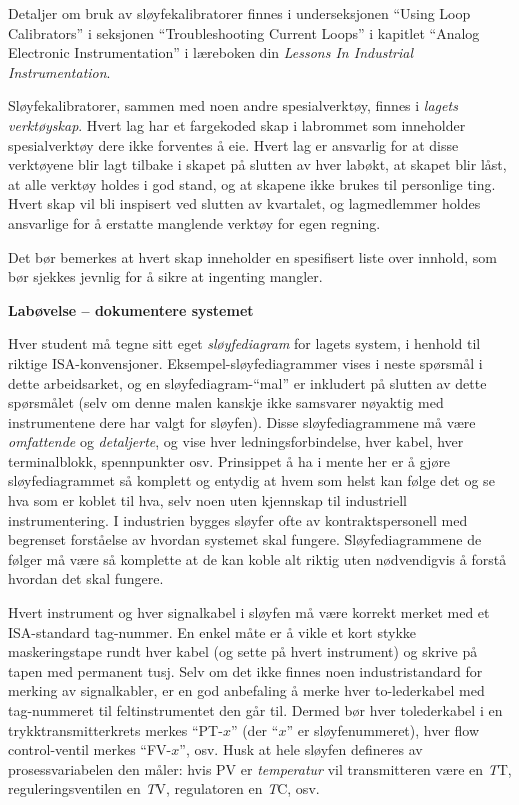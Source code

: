 Detaljer om bruk av sløyfekalibratorer finnes i underseksjonen ``Using Loop Calibrators'' i seksjonen ``Troubleshooting Current Loops'' i kapitlet ``Analog Electronic Instrumentation'' i læreboken din {\it Lessons In Industrial Instrumentation}.

\vskip 10pt

Sløyfekalibratorer, sammen med noen andre spesialverktøy, finnes i {\it lagets verktøyskap}.  Hvert lag har et fargekoded skap i labrommet som inneholder spesialverktøy dere ikke forventes å eie.  Hvert lag er ansvarlig for at disse verktøyene blir lagt tilbake i skapet på slutten av hver labøkt, at skapet blir låst, at alle verktøy holdes i god stand, og at skapene ikke brukes til personlige ting.  Hvert skap vil bli inspisert ved slutten av kvartalet, og lagmedlemmer holdes ansvarlige for å erstatte manglende verktøy for egen regning.

Det bør bemerkes at hvert skap inneholder en spesifisert liste over innhold, som bør sjekkes jevnlig for å sikre at ingenting mangler.








\vfil \eject

\noindent
{\bf Labøvelse -- dokumentere systemet}

\vskip 5pt

Hver student må tegne sitt eget {\it sløyfediagram} for lagets system, i henhold til riktige ISA-konvensjoner.  Eksempel-sløyfediagrammer vises i neste spørsmål i dette arbeidsarket, og en sløyfediagram-``mal'' er inkludert på slutten av dette spørsmålet (selv om denne malen kanskje ikke samsvarer nøyaktig med instrumentene dere har valgt for sløyfen).  Disse sløyfediagrammene må være {\it omfattende} og {\it detaljerte}, og vise hver ledningsforbindelse, hver kabel, hver terminalblokk, spennpunkter osv.  Prinsippet å ha i mente her er å gjøre sløyfediagrammet så komplett og entydig at hvem som helst kan følge det og se hva som er koblet til hva, selv noen uten kjennskap til industriell instrumentering.  I industrien bygges sløyfer ofte av kontraktspersonell med begrenset forståelse av hvordan systemet skal fungere.  Sløyfediagrammene de følger må være så komplette at de kan koble alt riktig uten nødvendigvis å forstå hvordan det skal fungere.

Hvert instrument og hver signalkabel i sløyfen må være korrekt merket med et ISA-standard tag-nummer.  En enkel måte er å vikle et kort stykke maskeringstape rundt hver kabel (og sette på hvert instrument) og skrive på tapen med permanent tusj.  Selv om det ikke finnes noen industristandard for merking av signalkabler, er en god anbefaling å merke hver to-lederkabel med tag-nummeret til feltinstrumentet den går til.  Dermed bør hver tolederkabel i en trykktransmitterkrets merkes ``PT-$x$'' (der ``$x$'' er sløyfenummeret), hver flow control-ventil merkes ``FV-$x$'', osv.  Husk at hele sløyfen defineres av prosessvariabelen den måler: hvis PV er {\it temperatur} vil transmitteren være en {\it T}T, reguleringsventilen en {\it T}V, regulatoren en {\it T}C, osv.

